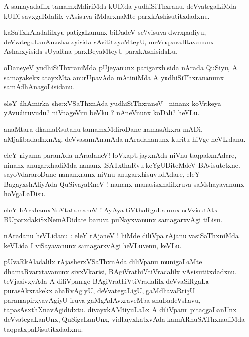 \documentclass{article}
\begin{document}
\begin{mn}
A samayadalilx tamamxMdiriMda kUDida yudhiSiThxranu, deVvategaLiMda kUDi savxgaRdalilx vAsisuva 
iMdarxnaMte parxkAshisutitxdadxnu.
\end{mn}

\begin{mn}
kaSaTxkAladalilxyu patigaLanunx biDadeV seVvisuva dwrxpadiyu, deVvategaLanAnxsharxyisida 
sAvititxyaMteyU, meVrupavaRtavanunx Asharxyisida sUyaRna parxBeyaMteyU parxkAshisidaLu.
\end{mn}

\begin{mn}
oDaneyeV yudhiSiThxraniMda pUjeyanunx parigarxhisida nArada QuSiyu, A samayakekx atayxMta 
anurUpavAda mAtiniMda A yudhiSiThxrananunx samAdhAnagoLisidanu.
\end{mn}

\begin{mn}
eleY dhAmirka sherxVSaThxnAda yudhiSiThxraneV ! ninanx koVrikeya yAvudiruvudu? niVnageVnu beVku ? 
nAneVnunx koDali? heVLu.
\end{mn}

\begin{mn}
anaMtara dhamaRsutanu tamamxMdiroDane namasAkxra mADi, aMjalibadadhxnAgi  deVvasamAnanAda 
nAradananunx kuritu hiVge heVLidanu.
\end{mn}

\begin{mn}
eleY niyama paranAda nAradaneV! loVkapUjayxnAda niVnu taqpatxnAdare, ninanx anugarxhadiMda nananx 
iSATxthaRvu keYgUDiteMdeV BAvisutetxne. sayoVdararoDane nananxnunx niVnu anugarxhisuvudAdare, eleY
BagayxshAliyAda QuSivayaRneV ! nananx manasisxnalilxruva saMshayavanunx hoVgaLaDisu.
\end{mn}

\begin{mn}
eleY bArxhamxNoVtatxmaneV ! AyAya tiVthaRgaLanunx seVvisutAtx BUparxdakiSxNemADidare baruva 
puNayxvanunx samagarxvAgi tiLisu.
\end{mn}


\begin{mn}
nAradanu heVLidanu : eleY rAjaneV ! hiMde diliVpa rAjanu vasiSaThxniMda keVLida I viSayavanunx 
samagarxvAgi heVLuvenu, keVLu.
\end{mn}

\begin{mn}
pUvaRkAladalilx rAjasherxVSaThxnAda diliVpanu munigaLaMte dhamaRvarxtavanunx sivxVkarisi, 
BAgiVrathiVtiVradalilx vAsisutitxdadxnu. teVjasivxyAda A diliVpanige BAgiVrathiVtiVradalilx
deVvaSiRgaLa purasAkxrakekx ahaRvAgiyU, deVvategaLigU, gaMdhavaRrigU paramapirxyavAgiyU iruva 
gaMgAdAvxraveMba shuBadeVshavu, tapasAsxthXnavAgididxtu. divayxkAMtiyuLaLx A diliVpanu 
pitaqgaLanUnx deVvategaLanUnx, QuSigaLanUnx, vidhuyxkatxvAda kamARnuSAThxnadiMda 
taqpatxpaDisutitxdadxnu.
\end{mn}
\end{document}
